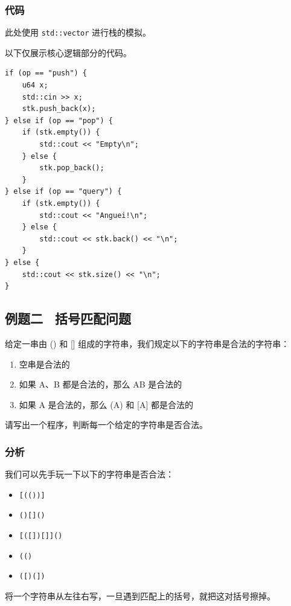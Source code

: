 \documentclass{report}
\begin{document}
\subsubsection{代码}

此处使用 \texttt{std::vector} 进行栈的模拟。

以下仅展示核心逻辑部分的代码。

\begin{verbatim}
if (op == "push") {
    u64 x;
    std::cin >> x;
    stk.push_back(x);
} else if (op == "pop") {
    if (stk.empty()) {
        std::cout << "Empty\n";
    } else {
        stk.pop_back();
    }
} else if (op == "query") {
    if (stk.empty()) {
        std::cout << "Anguei!\n";
    } else {
        std::cout << stk.back() << "\n";
    }
} else {
    std::cout << stk.size() << "\n";
}
\end{verbatim}

\subsection{例题二 \ 括号匹配问题}

给定一串由 () 和 [] 组成的字符串，我们规定以下的字符串是合法的字符串：

\begin{enumerate}
    \item 空串是合法的
    \item 如果 A、B 都是合法的，那么 AB 是合法的
    \item 如果 A 是合法的，那么 (A) 和 [A] 都是合法的
\end{enumerate}

请写出一个程序，判断每一个给定的字符串是否合法。

\subsubsection{分析}

我们可以先手玩一下以下的字符串是否合法：

\begin{itemize}
    \item \texttt{[(())]}
    \item \texttt{()[]()}
    \item \texttt{[([])[]]()}
    \item \texttt{(()}
    \item \texttt{([)(])}
\end{itemize}

将一个字符串从左往右写，一旦遇到匹配上的括号，就把这对括号擦掉。
\end{document}
